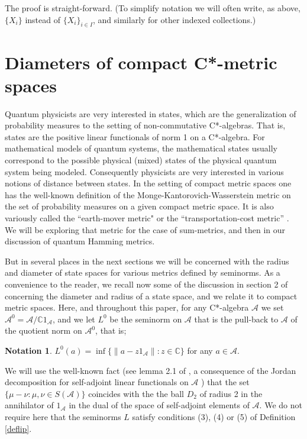 \documentclass{amsart}[14pt]
\theoremstyle{definition}
\newtheorem{notation}[theorem]{Notation}
\theoremstyle{remark}
\newcommand{\cA}{{\mathcal A}}
\newcommand{\bC}{{\mathbb C}}
\newcommand{\<}{\langle}
\renewcommand{\>}{\rangle}
\numberwithin{equation}{section}
\begin{document}
{The proof is straight-forward. (To simplify notation we will
often write, as above, $\{X_i\}$ instead of $\{X_i\}_{i \in I}$,
and similarly for other indexed collections.)


\section{Diameters of compact C*-metric spaces}
\label{diamstar}

Quantum physicists are very interested in states, which are the generalization
of probability measures to the setting of non-commutative C*-algebras. That is, states
are the positive linear functionals of norm 1 on a C*-algebra.
For mathematical models of quantum systems, the mathematical states
usually correspond to the possible physical (mixed) 
states of the physical quantum system
being modeled. Consequently
physicists are very interested in various notions of distance between states.
In the setting of compact metric spaces one has the
well-known definition of the Monge-Kantorovich-Wasserstein metric
on the set of probability measures on a given compact metric space.
It is also variously called the ``earth-mover metric" or the ``transportation-cost
metric'' \cite{Wvr4}. We will be exploring that metric for the case
of sum-metrics, and then in our discussion of quantum Hamming metrics.

 But in several places in the next sections we will be concerned with
 the radius and diameter of state spaces for various metrics defined
 by seminorms. 
As a convenience to the reader, we recall now some of
the discussion in section 2 of \cite{R5} concerning the 
diameter and radius of
a state space, and we relate it to compact metric spaces. 
Here, and throughout
this paper, 
for any C*-algebra $\cA$ we set $\cA^0 = \cA/\bC 1_\cA$, and
we let $L^0$ be the seminorm on 
$\cA$ that is the pull-back to $\cA$ of the quotient norm
on $\cA^0$, that is;
\begin{notation}
\label{Lzero}
$L^0(a) = \inf \{\|a  - z1_\cA\|: z \in \bC\}$
for any $a \in \cA$. 
\end{notation}

We will use the well-known fact (see lemma 2.1
of \cite{R5}, a consequence of the Jordan decomposition
for self-adjoint linear functionals on $\cA$ \cite{Pdr}) 
that the set $\{\mu - \nu: \mu, \nu \in S(\cA)\}$
coincides with the the ball $D_2$ of radius 2 in 
the annihilator of $1_\cA$ in the
dual of the space of self-adjoint elements of $\cA$. We do not
require here that the seminorms $L$ satisfy conditions (3), (4) or (5)
of Definition \ref{deflip}. 

}
\end{document}
